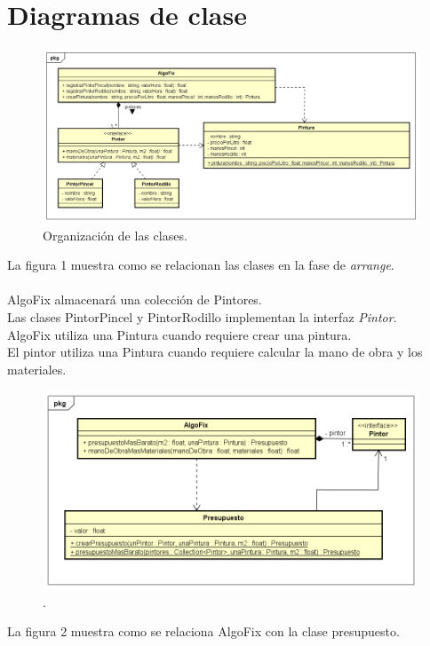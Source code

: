 \documentclass[titlepage,a4paper]{article}
\begin{document}
\section{Diagramas de clase}\label{sec:diagramasdeclase}
\begin{figure}[H]
\centering
\includegraphics[width=1\textwidth]{crearAPP.png}
\caption{\label{fig:class01}Organización de las clases.}
\end{figure}
La figura 1 muestra como se relacionan las clases en la fase de \textit{arrange}.\\\\
AlgoFix almacenará una colección de Pintores.\\
Las clases PintorPincel y PintorRodillo implementan la interfaz \textit{Pintor}.\\
AlgoFix utiliza una Pintura cuando requiere crear una pintura.\\
El pintor utiliza una Pintura cuando requiere calcular la mano de obra y los materiales.

\begin{figure}[H]
\centering
\includegraphics[width=1\textwidth]{AlgoPresupuesto.png}
\caption{\label{fig:class01} .}
\end{figure}
La figura 2 muestra como se relaciona AlgoFix con la clase presupuesto.
\end{document}
